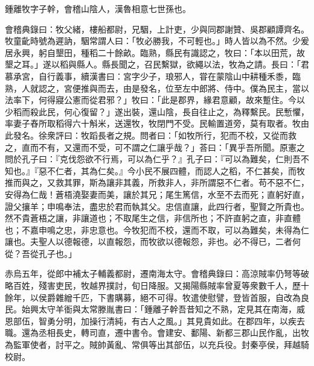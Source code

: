 
\begin{pinyinscope}
鍾離牧字子幹，會稽山陰人，漢魯相意七世孫也。

會稽典錄曰：牧父緒，樓船都尉，兄駰，上計吏，少與同郡謝贊、吳郡顧譚齊名。牧童齔時號為遲訥，駰常謂人曰：「牧必勝我，不可輕也。」時人皆以為不然。少爰居永興，躬自墾田，種稻二十餘畝。臨熟，縣民有識認之，牧曰：「本以田荒，故墾之耳。」遂以稻與縣人。縣長聞之，召民繫獄，欲繩以法，牧為之請。長曰：「君慕承宮，自行義事，續漢書曰：宮字少子，琅邪人，甞在蒙陰山中耕種禾黍，臨熟，人就認之，宮便推與而去，由是發名，位至左中郎將、侍中。僕為民主，當以法率下，何得寢公憲而從君邪？」牧曰：「此是郡界，緣君意顧，故來蹔住。今以少稻而殺此民，何心復留？」遂出裝，還山陰，長自往止之，為釋繫民。民慙懼，率妻子舂所取稻得六十斛米，送還牧，牧閉門不受。民輸置道旁，莫有取者。牧由此發名。徐衆評曰：牧蹈長者之規。問者曰：「如牧所行，犯而不校，又從而救之，直而不有，又還而不受，可不謂之仁讓乎哉？」荅曰：「異乎吾所聞。原憲之問於孔子曰：『克伐怨欲不行焉，可以為仁乎？』孔子曰：『可以為難矣，仁則吾不知也。』『惡不仁者，其為仁矣。』今小民不展四體，而認人之稻，不仁甚矣，而牧推而與之，又救其罪，斯為讓非其義，所救非人，非所謂惡不仁者。苟不惡不仁，安得為仁哉！蒼梧澆娶妻而美，讓於其兄；尾生篤信，水至不去而死；直躬好直，證父攘羊；申鳴奉法，盡忠於君而執其父。忠信直讓，此四行者，聖賢之所貴也。然不貴蒼梧之讓，非讓道也；不取尾生之信，非信所也；不許直躬之直，非直體也；不嘉申鳴之忠，非忠意也。今牧犯而不校，還而不取，可以為難矣，未得為仁讓也。夫聖人以德報德，以直報怨，而牧欲以德報怨，非也。必不得已，二者何從？吾從孔子也。」

赤烏五年，從郎中補太子輔義都尉，遷南海太守。會稽典錄曰：高涼賊率仍弩等破略百姓，殘害吏民，牧越界撲討，旬日降服。又揭陽縣賊率曾夏等衆數千人，歷十餘年，以侯爵雜繒千匹，下書購募，絕不可得。牧遣使慰譬，登皆首服，自改為良民。始興太守羊衜與太常滕胤書曰：「鍾離子幹吾昔知之不熟，定見其在南海，威恩部伍，智勇分明，加操行清純，有古人之風。」其見貴如此。在郡四年，以疾去職。還為丞相長史，轉司直，遷中書令。會建安、鄱陽、新都三郡山民作亂，出牧為監軍使者，討平之。賊帥黃亂、常俱等出其部伍，以充兵役。封秦亭侯，拜越騎校尉。


\end{pinyinscope}
